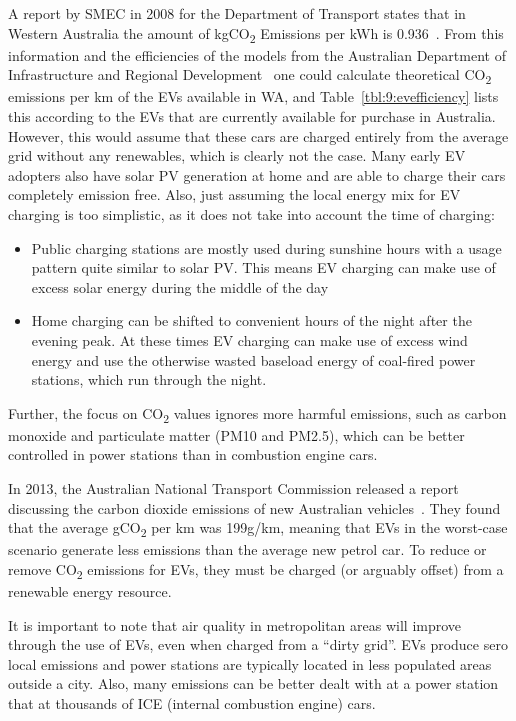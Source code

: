 A report by SMEC in 2008 for the Department of Transport states that in Western Australia the amount of kgCO\textsubscript{2} Emissions per kWh is 0.936~\cite{van_namen_green_2011}. From this information and the efficiencies of the models from the Australian Department of Infrastructure and Regional Development~\cite{department_of_infrastructure_and_regional_development_vehicle_2016} one could calculate theoretical CO\textsubscript{2} emissions per km of the EVs available in WA, and Table~\ref{tbl:9:evefficiency} lists this according to the EVs that are currently available for purchase in Australia. However, this would assume that these cars are charged entirely from the average grid without any renewables, which is clearly not the case. Many early EV adopters also have solar PV generation at home and are able to charge their cars completely emission free. Also, just assuming the local energy mix for EV charging is too simplistic, as it does not take into account the time of charging:
\begin{itemize}
	\item Public charging stations are mostly used during sunshine hours with a usage pattern quite similar to solar PV. This means EV charging can make use of excess solar energy during the middle of the day
	\item Home charging can be shifted to convenient hours of the night after the evening peak. At these times EV charging can make use of excess wind energy and use the otherwise wasted baseload energy of coal-fired power stations, which run through the night.
\end{itemize}
Further, the focus on CO\textsubscript{2} values ignores more harmful emissions, such as carbon monoxide and particulate matter (PM10 and PM2.5), which can be better controlled in power stations than in combustion engine cars.


In 2013, the Australian National Transport Commission released a report discussing the carbon dioxide emissions of new Australian vehicles~\cite{national_transport_commission_carbon_2014}. They found that the average gCO\textsubscript{2} per km was 199g/km, meaning that EVs in the worst-case scenario generate less emissions than the average new petrol car. To reduce or remove CO\textsubscript{2} emissions for EVs, they must be charged (or arguably offset) from a renewable energy resource.
 
It is important to note that air quality in metropolitan areas will improve through the use of EVs, even when charged from a “dirty grid”. EVs produce sero local emissions and power stations are typically located in less populated areas outside a city. Also, many emissions can be better dealt with at a power station that at thousands of ICE (internal combustion engine) cars.

